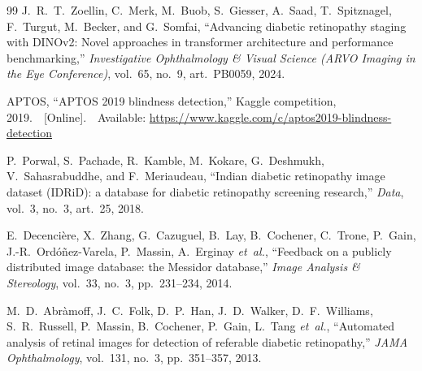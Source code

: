 \documentclass[journal]{IEEEtran}
\begin{document}
\begin{thebibliography}{99}
    J.~R.~T.\ Zoellin, C.~Merk, M.~Buob, S.~Giesser, A.~Saad, T.~Spitznagel, F.~Turgut, M.~Becker, and G.~Somfai, ``Advancing diabetic retinopathy staging with DINOv2: Novel approaches in transformer architecture and performance benchmarking,'' \emph{Investigative Ophthalmology \& Visual Science (ARVO Imaging in the Eye Conference)}, vol.\ 65, no.\ 9, art.\ PB0059, 2024.


    APTOS, ``APTOS 2019 blindness detection,'' Kaggle competition, 2019.\ \ [Online].\ \ Available: \url{https://www.kaggle.com/c/aptos2019-blindness-detection}

    P.~Porwal, S.~Pachade, R.~Kamble, M.~Kokare, G.~Deshmukh, V.~Sahasrabuddhe, and F.~Meriaudeau, ``Indian diabetic retinopathy image dataset (IDRiD): a database for diabetic retinopathy screening research,'' \emph{Data}, vol.\ 3, no.\ 3, art.\ 25, 2018.

    E.~Decenci\`ere, X.~Zhang, G.~Cazuguel, B.~Lay, B.~Cochener, C.~Trone, P.~Gain, J.-R.\ Ord\'o\~nez-Varela, P.~Massin, A.~Erginay \emph{et~al.}, ``Feedback on a publicly distributed image database: the Messidor database,'' \emph{Image Analysis \& Stereology}, vol.\ 33, no.\ 3, pp.\ 231--234, 2014.

    M.~D.\ Abr\`amoff, J.~C.\ Folk, D.~P.\ Han, J.~D.\ Walker, D.~F.\ Williams, S.~R.\ Russell, P.~Massin, B.~Cochener, P.~Gain, L.~Tang \emph{et~al.}, ``Automated analysis of retinal images for detection of referable diabetic retinopathy,'' \emph{JAMA Ophthalmology}, vol.\ 131, no.\ 3, pp.\ 351--357, 2013.


\end{thebibliography}
\end{document}
